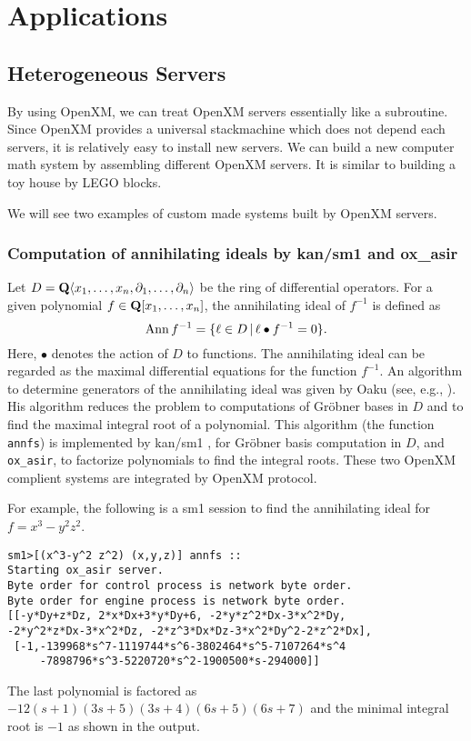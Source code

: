 \section{Applications}

\subsection{Heterogeneous Servers}

\def\pd#1{ \partial_{#1} }

By using OpenXM, we can treat OpenXM servers essentially 
like a subroutine.
Since OpenXM provides a universal stackmachine which does not
depend each servers, 
it is relatively easy to install new servers.
We can build a new computer math system by assembling
different OpenXM servers.
It is similar to building a toy house by LEGO blocks.

We will see two examples of custom made systems
built by OpenXM servers.

\subsubsection{Computation of annihilating ideals by kan/sm1 and ox\_asir}

Let $D = {\bf Q} \langle x_1, \ldots, x_n , \pd{1}, \ldots, \pd{n} \rangle$
be the ring of differential operators.
For a given polynomial
$ f \in {\bf Q}[x_1, \ldots, x_n] $,
the annihilating ideal of $f^{-1}$ is defined as
$$ {\rm Ann}\, f^{-1} = \{ \ell \in D \,|\,
  \ell \bullet f^{-1} = 0 \}.
$$
Here, $\bullet$ denotes the action of $D$ to functions.
The annihilating ideal can be regarded as the maximal differential
equations for the function $f^{-1}$.
An algorithm to determine generators of the annihilating ideal
was given by Oaku (see, e.g., \cite[5.3]{sst-book}).
His algorithm reduces the problem to computations of Gr\"obner bases
in $D$ and to find the maximal integral root of a polynomial.
This algorithm (the function {\tt annfs}) is implemented by
kan/sm1 \cite{kan}, for Gr\"obner basis computation in $D$, and
{\tt ox\_asir}, to factorize polynomials to find the integral
roots.
These two OpenXM complient systems are integrated by
OpenXM protocol.

For example, the following is a sm1 session to find the annihilating
ideal for $f = x^3 - y^2 z^2$.
\begin{verbatim}
sm1>[(x^3-y^2 z^2) (x,y,z)] annfs ::
Starting ox_asir server.
Byte order for control process is network byte order.
Byte order for engine process is network byte order.
[[-y*Dy+z*Dz, 2*x*Dx+3*y*Dy+6, -2*y*z^2*Dx-3*x^2*Dy, 
-2*y^2*z*Dx-3*x^2*Dz, -2*z^3*Dx*Dz-3*x^2*Dy^2-2*z^2*Dx], 
 [-1,-139968*s^7-1119744*s^6-3802464*s^5-7107264*s^4
     -7898796*s^3-5220720*s^2-1900500*s-294000]] 
\end{verbatim}
The last polynomial is factored as
$-12(s+1)(3s+5)(3s+4)(6s+5)(6s+7)$
and the minimal integral root is $-1$
as shown in the output.

